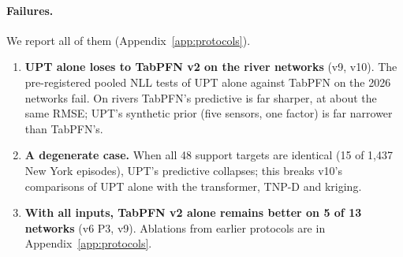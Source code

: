 \paragraph{Failures.} We report all of them (Appendix~\ref{app:protocols}).
\begin{enumerate}
  \item \textbf{UPT alone loses to TabPFN v2 on the river networks} (v9, v10). The pre-registered pooled NLL tests of
  UPT alone against TabPFN on the 2026 networks fail. On rivers TabPFN's predictive is far sharper, at about the same
  RMSE; UPT's synthetic prior (five sensors, one factor) is far narrower than TabPFN's.
  \item \textbf{A degenerate case.} When all 48 support targets are identical (15 of 1{,}437 New York episodes),
  UPT's predictive collapses; this breaks v10's comparisons of UPT alone with the transformer, TNP-D and kriging.
  \item \textbf{With all inputs, TabPFN v2 alone remains better on 5 of 13 networks} (v6 P3, v9). Ablations from
  earlier protocols are in Appendix~\ref{app:protocols}.
\end{enumerate}
